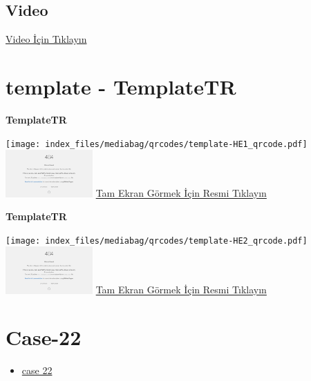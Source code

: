 \documentclass[
  letterpaper,
  DIV=11,
  numbers=noendperiod]{scrreprt}
\providecommand{\tightlist}{%
  \setlength{\itemsep}{0pt}\setlength{\parskip}{0pt}}\usepackage{longtable,booktabs,array}
\begin{document}
\hypertarget{video-20}{%
\subsection{Video}\label{video-20}}

\href{https://www.youtube.com/watch?v=Uith4SvB2_Q}{Video İçin Tıklayın}

\hypertarget{sec-template}{%
\section{template - TemplateTR}\label{sec-template}}

\textbf{TemplateTR}

\texttt{[image: index\_files/mediabag/qrcodes/template-HE1\_qrcode.pdf]}
\href{https://images.patolojiatlasi.com/template/HE1.html}{\includegraphics[width=0.25\textwidth,height=\textheight]{./screenshots/thumbnail_template-HE1.png}}
\href{https://images.patolojiatlasi.com/template/HE1.html}{Tam Ekran
Görmek İçin Resmi Tıklayın}

\textbf{TemplateTR}

\texttt{[image: index\_files/mediabag/qrcodes/template-HE2\_qrcode.pdf]}
\href{https://images.patolojiatlasi.com/template/HE2.html}{\includegraphics[width=0.25\textwidth,height=\textheight]{./screenshots/thumbnail_template-HE2.png}}
\href{https://images.patolojiatlasi.com/template/HE2.html}{Tam Ekran
Görmek İçin Resmi Tıklayın}

\hypertarget{sec-hacettepe-case-of-the-month-case-22}{%
\section{Case-22}\label{sec-hacettepe-case-of-the-month-case-22}}

\begin{itemize}
\tightlist
\item
  \href{https://www.youtube.com/watch?v=wo6N0q5EiWc&ab_channel=KemalKosemehmetoglu}{case
  22}
\end{itemize}
\end{document}
